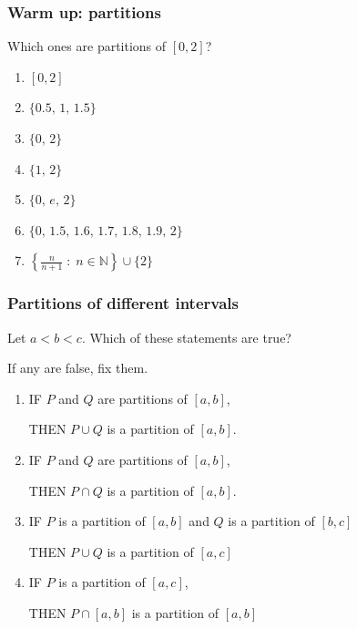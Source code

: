 \begin{frame}[t]
	\frametitle{Warm up: partitions}

	Which ones are partitions of $[0,2]$?

	\begin{enumerate}
		\item $\displaystyle [0,2]$

		\item $\displaystyle \{0.5, \,1, \,1.5\}$

		\item $\displaystyle \{0,\,2\}$

		\item $\displaystyle \{1,\,2\}$

		\item $\displaystyle \{0, \,e, \,2 \}$

		\item $\displaystyle \{0, \,1.5, \,1.6, \,1.7, \,1.8, \,1.9, \,2\}$

		\item $\displaystyle \left\{ \frac{n}{n+1}\; : \; n \in \mathbb{N}\right\} \cup
			\{ 2 \}$
	\end{enumerate}
\end{frame}

\begin{frame}[t]
	\fontsize{13}{13}\selectfont
	\frametitle{Partitions of different intervals}

	Let $a<b<c$. Which of these statements are true?

	If any are false, fix them.
	\vspace{.1cm}
	\begin{enumerate}
		\item IF $P$ and $Q$ are partitions of $[a,b]$,
			\vspace{.1cm}

			THEN $P \cup Q$ is a partition of $[a,b]$.
			\vspace{.1cm}

		\item IF $P$ and $Q$ are partitions of $[a,b]$,
			\vspace{.1cm}

			THEN $P \cap Q$ is a partition of $[a,b]$.
			\vspace{.1cm}

		\item IF $P$ is a partition of $[a,b]$ and $Q$ is a partition of $[b,c]$
			\vspace{.1cm}

			THEN $P \cup Q$ is a partition of $[a,c]$
			\vspace{.1cm}

		\item IF $P$ is a partition of $[a,c]$,
			\vspace{.1cm}

			THEN $P \cap [a,b]$ is a partition of $[a,b]$
	\end{enumerate}
\end{frame}

